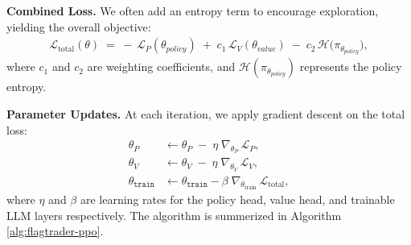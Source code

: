 \textbf{Combined Loss.}
We often add an entropy term to encourage exploration, yielding the overall objective:
\begin{align}
    \mathcal{L}_{\text{total}}(\theta)
\;=\;
-\,\mathcal{L}_{P}(\theta_{policy})
\;+\;
c_1\,\mathcal{L}_{V}(\theta_{value})
\;-\;
c_2\,\mathcal{H}\bigl(\pi_{\theta_{policy}}\bigr),
\end{align}
where \(c_1\) and \(c_2\) are weighting coefficients, and \(\mathcal{H}(\pi_{\theta_{policy}})\) represents the policy entropy.

\textbf{Parameter Updates.}
At each iteration, we apply gradient descent on the total loss:
\begin{align}
\theta_P       &\leftarrow \theta_P       \;-\; \eta \;\nabla_{\theta_P}\,\mathcal{L}_P, \\
\theta_V       &\leftarrow \theta_V       \;-\; \eta \;\nabla_{\theta_V}\,\mathcal{L}_V, \\
\theta_{\texttt{train}} &\leftarrow \theta_{\texttt{train}} - \beta \;\nabla_{\theta_{\text{train}}}\,\mathcal{L}_{\text{total}},
\end{align}
where \(\eta\) and \(\beta\) are learning rates for the policy head, value head, and trainable LLM layers respectively. The algorithm is summerized in Algorithm \ref{alg:flagtrader-ppo}.


